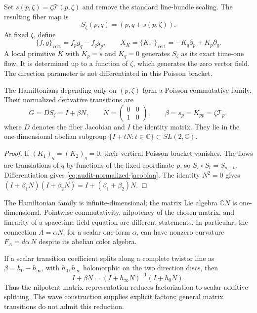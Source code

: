 Set $s(p,\zeta)=\zeta\mathcal T(p,\zeta)$ and remove the standard
line-bundle scaling. The resulting fiber map is
\begin{equation}\label{eq:audit-normalized-shear}
S_\zeta(p,q)=(p,q+s(p,\zeta)).
\end{equation}
At fixed $\zeta$, define
\[
\{f,g\}_{\mathrm{vert}}=f_pg_q-f_qg_p,
\qquad
X_K=\{K,\cdot\}_{\mathrm{vert}}
=-K_q\partial_p+K_p\partial_q.
\]
A local primitive $K$ with $K_p=s$ and $K_q=0$ generates
$S_\zeta$ as its exact time-one flow. It is determined up to a function
of $\zeta$, which generates the zero vector field. The direction parameter
is not differentiated in this Poisson bracket.

\begin{proposition}
The Hamiltonians depending only on $(p,\zeta)$ form a Poisson-commutative
family. Their normalized derivative transitions are
\begin{equation}\label{eq:audit-normalized-jacobian}
G=DS_\zeta=I+\beta N,
\qquad
N=\begin{pmatrix}0&0\\1&0\end{pmatrix},
\qquad
\beta=s_p=K_{pp}=\zeta\mathcal T_p,
\end{equation}
where $D$ denotes the fiber Jacobian and $I$ the identity matrix.
They lie in the one-dimensional abelian subgroup
$\{I+tN:t\in\mathbb C\}\subset SL(2,\mathbb C)$.
\end{proposition}
\begin{proof}
If $(K_1)_q=(K_2)_q=0$, their vertical Poisson bracket vanishes.
The flows are translations of $q$ by functions of the fixed coordinate
$p$, so $S_s\circ S_t=S_{s+t}$. Differentiation gives
\eqref{eq:audit-normalized-jacobian}. The identity $N^2=0$ gives
$(I+\beta_1N)(I+\beta_2N)=I+(\beta_1+\beta_2)N$.
\end{proof}

The Hamiltonian family is infinite-dimensional; the matrix Lie algebra
$\mathbb C N$ is one-dimensional. Pointwise commutativity, nilpotency of
the chosen matrix, and linearity of a spacetime field equation are
different statements. In particular, the connection $A=\alpha N$, for
a scalar one-form $\alpha$, can have nonzero curvature
$F_A=d\alpha\,N$ despite its abelian color algebra.

If a scalar transition coefficient splits along a complete twistor line
as $\beta=h_0-h_\infty$, with $h_0,h_\infty$ holomorphic on the two
direction discs, then
\[
I+\beta N=(I+h_\infty N)^{-1}(I+h_0N).
\]
Thus the nilpotent matrix representation reduces factorization to scalar
additive splitting. The wave construction supplies explicit factors;
general matrix transitions do not admit this reduction.

